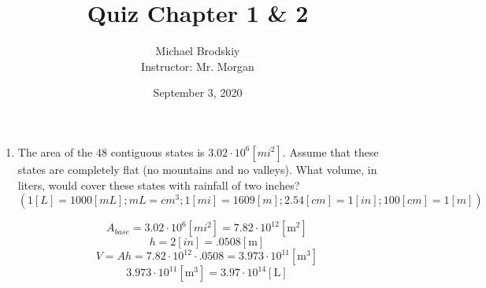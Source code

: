 \documentclass[12pt]{article}
\title{Quiz Chapter 1 \& 2}
\date{September 3, 2020}
\author{Michael Brodskiy\\ \small Instructor: Mr. Morgan}
\begin{document}
\maketitle

\begin{enumerate}

  \item The area of the 48 contiguous states is $3.02\cdot10^6[mi^2]$.  Assume that these states are completely flat (no mountains and no valleys).  What volume, in liters, would cover these states with rainfall of two inches?  $(1[L] = 1000[mL]; mL = cm^3; 1[mi] = 1609[m];  2.54 [cm] = 1[in];  100[cm] = 1[m])$

    $$A_{base}=3.02\cdot10^6[mi^2]=7.82\cdot10^{12}[\si{\meter\squared}]$$
    $$h=2[in]=.0508[\si{\meter}]$$
    $$V=Ah=7.82\cdot10^{12}\cdot.0508=3.973\cdot10^{11}[\si{\meter\cubed}]$$
    $$3.973\cdot10^{11}[\si{\meter\cubed}]=3.97\cdot10^{14}[\si{\liter}]$$

\end{enumerate}
\end{document}
